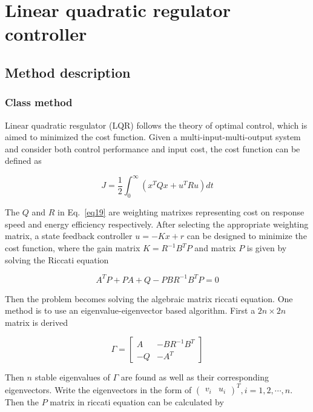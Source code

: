 \documentclass[hyperref]{article}
\theoremstyle{nonumberplain}
\begin{document}
	
	\section{Linear quadratic regulator controller}
	
	\subsection{Method description}
	
	\subsubsection{Class method}
	
	\hspace{1.0em}
	Linear quadratic resgulator (LQR) follows the theory of optimal control, which is aimed to minimized the cost function. Given a multi-input-multi-output system and consider both control performance and input cost, the cost function can be defined as
	
	\begin{equation}
	J=\frac{1}{2}\int_{0}^{\infty}(x^{T}Qx+u^{T}Ru)dt
	\label{eq19}
	\end{equation}
	
	The $Q$ and $R$ in Eq.~\ref{eq19} are weighting matrixes representing cost on response speed and energy efficiency respectively. After selecting the appropriate weighting matrix, a state feedback controller $u=-Kx+r$ can be designed to minimize the cost function, where the gain matrix $K=R^{-1}B^{T}P$ and matrix $P$ is given by solving the Riccati equation
	
	\begin{equation}
	A^{T}P+PA+Q-PBR^{-1}B^{T}P=0
	\label{eq20}
	\end{equation}
	
	Then the problem becomes solving the algebraic matrix riccati equation. One method is to use an eigenvalue-eigenvector based algorithm. First a $2n \times 2n$ matrix is derived
	
	\begin{equation}
	\Gamma =\begin{bmatrix}
	A &-BR^{-1}B^{T} \\ 
	-Q &-A^{T} 
	\end{bmatrix}
	\label{eq21}
	\end{equation}
	
	Then $n$ stable eigenvalues of $\Gamma$ are found as well as their corresponding eigenvectors. Write the eigenvectors in the form of $\begin{pmatrix}
	v_{i} & u_{i}
	\end{pmatrix}^{T},i=1,2,\cdots ,n$. Then the $P$ matrix in riccati equation can be calculated by
	
\end{document}
